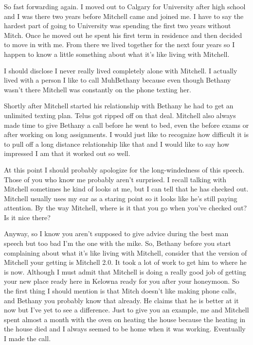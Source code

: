 So fast forwarding again. I moved out to Calgary for University after high school and I was there two years before Mitchell came and joined me. I have to say the hardest part of going to University was spending the first two years without Mitch. Once he moved out he spent his first term in residence and then decided to move in with me. From there we lived together for the next four years so I happen to know a little something about what it's like living with Mitchell.

I should disclose I never really lived completely alone with Mitchell. I actually lived with a person I like to call MuhBethany because even though Bethany wasn't there Mitchell was constantly on the phone texting her.

Shortly after Mitchell started his relationship with Bethany he had to get an unlimited texting plan. Telus got ripped off on that deal. Mitchell also always made time to give Bethany a call before he went to bed, even the before exams or after working on long assignments. I would just like to recognize how difficult it is to pull off a long distance relationship like that and I would like to say how impressed I am that it worked out so well.

At this point I should probably apologize for the long-windedness of this speech. Those of you who know me probably aren't surprised. I recall talking with Mitchell sometimes he kind of looks at me, but I can tell that he has checked out. Mitchell usually uses my ear as a staring point so it looks like he's still paying attention. By the way Mitchell, where is it that you go when you've checked out? Is it nice there?

Anyway, so I know you aren't supposed to give advice during the best man speech but too bad I'm the one with the mike. So, Bethany before you start complaining about what it's like living with Mitchell, consider that the version of Mitchell your getting is Mitchell 2.0. It took a lot of work to get him to where he is now. Although I must admit that Mitchell is doing a really good job of getting your new place ready here in Kelowna ready for you after your honeymoon. So the first thing I should mention is that Mitch doesn't like making phone calls, and Bethany you probably know that already. He claims that he is better at it now but I've yet to see a difference. Just to give you an example, me and Mitchell spent almost a month with the oven on heating the house because the heating in the house died and I always seemed to be home when it was working. Eventually I made the call.

